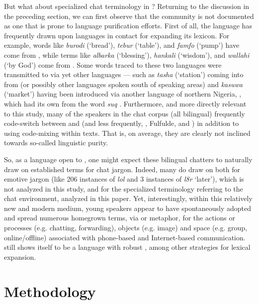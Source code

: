 \documentclass[output=paper
,newtxmath
,modfonts
,nonflat]{langsci/langscibook}
\begin{document}
But what about specialized chat terminology in ? Returning to the discussion in the preceding section, we can first observe that the  community is not documented as one that is prone to language purification efforts. First of all, the  language has frequently drawn upon languages in contact for expanding its lexicon. For example, words like \textit{burodi} (‘bread’), \textit{tebur} (‘table’), and \textit{famfo} (‘pump’) have come from , while terms like \textit{albarka} (‘blessing’), \textit{hankali} (‘wisdom’), and \textit{wallahi} (‘by God’) come from . Some words traced to these two languages were transmitted to  via yet other languages — such as \textit{tasha} (‘station’) coming into  from  (or possibly other languages spoken south of  speaking areas) and \textit{kasuwa} (‘market’) having been introduced via another language of northern Nigeria, , which had its own  from the  word \textit{suq} \citep{newman2000comp}. Furthermore, and more directly relevant to this study, many of the  speakers in the  chat corpus (all bilingual) frequently code-switch between  and  (and less frequently, , Fulfulde, and ) in addition to using  code-mixing within  texts. That is, on average, they are clearly not inclined towards so-called linguistic purity.

So, as a language open to , one might expect these bilingual chatters to naturally draw on established  terms for chat jargon. Indeed, many do draw on  both for emotive jargon (like 206 instances of \textit{lol} and 3 instances of \textit{l8r} ‘later’), which is not analyzed in this study, and for the specialized terminology referring to the chat environment, analyzed in this paper. Yet, interestingly, within this relatively new and modern medium, young  speakers appear to have spontaneously adopted and spread numerous homegrown terms, via  or metaphor, for the actions or processes (e.g. chatting, forwarding), objects (e.g. image) and space (e.g. group, online/offline) associated with phone-based and Internet-based communication.  still shows itself to be a language with robust , among other strategies for lexical expansion.

\section{Methodology}\label{sec:purvis:3}
\end{document}
